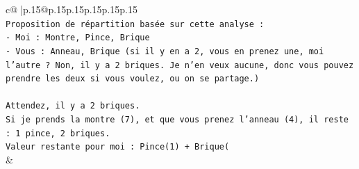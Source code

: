 \documentclass{article}
\begin{document}
{\begin{supertabular}{c@{$\;$}|p{.15\linewidth}@{}p{.15\linewidth}p{.15\linewidth}p{.15\linewidth}p{.15\linewidth}p{.15\linewidth}}
{{{\\ 
\texttt{Proposition de répartition basée sur cette analyse :} \\
\texttt{{-} Moi : Montre, Pince, Brique} \\
\texttt{{-} Vous : Anneau, Brique (si il y en a 2, vous en prenez une, moi l'autre ? Non, il y a 2 briques. Je n'en veux aucune, donc vous pouvez prendre les deux si vous voulez, ou on se partage.)} \\
\\ 
\texttt{Attendez, il y a 2 briques.} \\
\texttt{Si je prends la montre (7), et que vous prenez l'anneau (4), il reste : 1 pince, 2 briques.} \\
\texttt{Valeur restante pour moi : Pince(1) + Brique(} \\
            }
        }
    }
    & \\ \\


\end{supertabular}}
\end{document}
